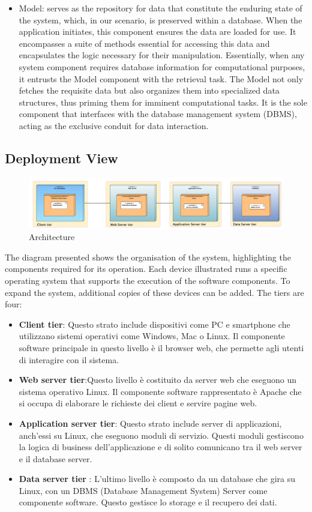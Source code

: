 \begin{itemize}
\item Model: serves as the repository for data that constitute the enduring state of the system, which, in our scenario, is preserved within a database. When the application initiates, this component ensures the data are loaded for use. It encompasses a suite of methods essential for accessing this data and encapsulates the logic necessary for their manipulation. Essentially, when any system component requires database information for computational purposes, it entrusts the Model component with the retrieval task. The Model not only fetches the requisite data but also organizes them into specialized data structures, thus priming them for imminent computational tasks. It is the sole component that interfaces with the database management system (DBMS), acting as the exclusive conduit for data interaction.
    
\end{itemize}

\subsection {Deployment View}
\begin{figure}[H]
    \centering
    \includegraphics[width=1.1\textwidth]{Design/DeploymentView.png}
    \caption{Architecture}
    \label{fig:enter-label}
\end{figure}
The diagram presented shows the organisation of the system, highlighting the components required for its operation. Each device illustrated runs a specific operating system that supports the execution of the software components. To expand the system, additional copies of these devices can be added.
The tiers are four:
\begin{itemize}
    \item \textbf{Client tier}:  Questo strato include dispositivi come PC e smartphone che utilizzano sistemi operativi come Windows, Mac o Linux. Il componente software principale in questo livello è il browser web, che permette agli utenti di interagire con il sistema.
    \item \textbf{Web server tier}:Questo livello è costituito da server web che eseguono un sistema operativo Linux. Il componente software rappresentato è Apache che si occupa di elaborare le richieste dei client e servire pagine web.

    \item \textbf{Application server tier}:  Questo strato include server di applicazioni, anch'essi su Linux, che eseguono moduli di servizio. Questi moduli gestiscono la logica di business dell'applicazione e di solito comunicano tra il web server e il database server.
    \item \textbf{Data server tier} :  L'ultimo livello è composto da un database che gira su Linux, con un DBMS (Database Management System) Server come componente software. Questo gestisce lo storage e il recupero dei dati.
\end{itemize}
